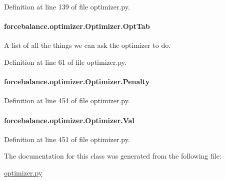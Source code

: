 Definition at line 139 of file optimizer.\-py.

\hypertarget{classforcebalance_1_1optimizer_1_1Optimizer_a30e7e28bf0af3cffc94aa51a58a3d345}{
\paragraph[{Opt\-Tab}]{\setlength{\rightskip}{0pt plus 5cm}forcebalance.\-optimizer.\-Optimizer.\-Opt\-Tab}}\label{classforcebalance_1_1optimizer_1_1Optimizer_a30e7e28bf0af3cffc94aa51a58a3d345}


A list of all the things we can ask the optimizer to do. 



Definition at line 61 of file optimizer.\-py.

\hypertarget{classforcebalance_1_1optimizer_1_1Optimizer_a5dc01aec7e22062a42cc83298c49cadd}{
\paragraph[{Penalty}]{\setlength{\rightskip}{0pt plus 5cm}forcebalance.\-optimizer.\-Optimizer.\-Penalty}}\label{classforcebalance_1_1optimizer_1_1Optimizer_a5dc01aec7e22062a42cc83298c49cadd}


Definition at line 454 of file optimizer.\-py.

\hypertarget{classforcebalance_1_1optimizer_1_1Optimizer_a2577b97a9ee5f3fcd4aa108a2baafc04}{
\paragraph[{Val}]{\setlength{\rightskip}{0pt plus 5cm}forcebalance.\-optimizer.\-Optimizer.\-Val}}\label{classforcebalance_1_1optimizer_1_1Optimizer_a2577b97a9ee5f3fcd4aa108a2baafc04}


Definition at line 451 of file optimizer.\-py.



The documentation for this class was generated from the following file\-:\begin{DoxyCompactItemize}
\item 
\hyperlink{optimizer_8py}{optimizer.\-py}\end{DoxyCompactItemize}
